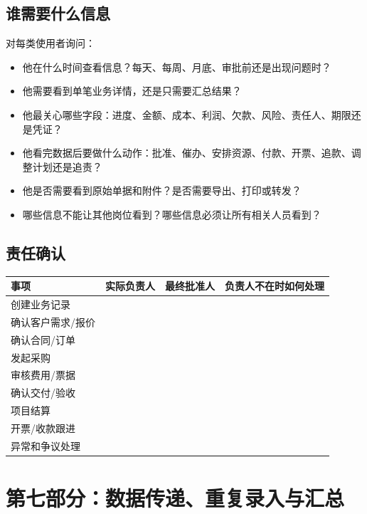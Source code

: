 \documentclass[UTF8,a4paper,11pt]{ctexart}
\begin{document}
\subsection{谁需要什么信息}
对每类使用者询问：
\begin{itemize}
  \item 他在什么时间查看信息？每天、每周、月底、审批前还是出现问题时？
  \item 他需要看到单笔业务详情，还是只需要汇总结果？
  \item 他最关心哪些字段：进度、金额、成本、利润、欠款、风险、责任人、期限还是凭证？
  \item 他看完数据后要做什么动作：批准、催办、安排资源、付款、开票、追款、调整计划还是追责？
  \item 他是否需要看到原始单据和附件？是否需要导出、打印或转发？
  \item 哪些信息不能让其他岗位看到？哪些信息必须让所有相关人员看到？
\end{itemize}

\subsection{责任确认}
\begin{longtable}{p{}p{}p{}p{}}
\toprule
事项 & 实际负责人 & 最终批准人 & 负责人不在时如何处理 \\
\midrule
创建业务记录 & & & \\
确认客户需求/报价 & & & \\
确认合同/订单 & & & \\
发起采购 & & & \\
审核费用/票据 & & & \\
确认交付/验收 & & & \\
项目结算 & & & \\
开票/收款跟进 & & & \\
异常和争议处理 & & & \\
\bottomrule
\end{longtable}

\section{第七部分：数据传递、重复录入与汇总}
\end{document}
